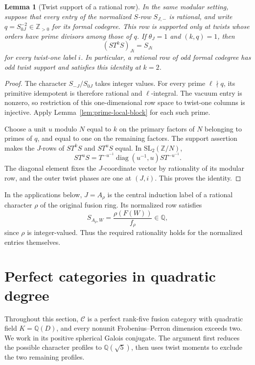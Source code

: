 \documentclass[11pt,a4paper]{article}
\newtheorem{lemma}[theorem]{Lemma}
\numberwithin{equation}{section}
\begin{document}
\begin{lemma}[Twist support of a rational row]\label{lem:odd-row}
In the same modular setting, suppose that every entry of the
normalized $S$-row $S_{J,-}$ is rational, and write
$q=S_{0J}^{-2}\in\mathbb Z_{>0}$ for its formal codegree.
This row is supported only at twists whose orders
have prime divisors among those of $q$. If $\theta_J=1$ and
$(k,q)=1$, then
\[
                    (ST^kS)_{Ji}=S_{Ji}
\]
for every twist-one label $i$. In particular, a rational row of
odd formal codegree has odd twist support and satisfies this identity
at $k=2$.
\end{lemma}
\begin{proof}
The character $S_{-J}/S_{0J}$ takes integer values. For every prime
$\ell\nmid q$, its primitive idempotent is therefore rational and
$\ell$-integral. The vacuum entry is nonzero, so restriction of this
one-dimensional row space to twist-one columns is injective.
Apply Lemma~\ref{lem:prime-local-block} for each such prime.

Choose a unit $u$ modulo $N$ equal to $k$ on the primary factors of
$N$ belonging to primes of $q$, and equal to one on the remaining
factors. The support assertion makes the $J$-rows of $ST^kS$ and
$ST^uS$ equal. In $\mathrm{SL}_2(\mathbb Z/N)$,
\[
 ST^uS=T^{-u^{-1}}\operatorname{diag}(u^{-1},u)ST^{-u^{-1}}.
\]
The diagonal element fixes the $J$-coordinate vector by rationality
of its modular row, and the outer twist phases are one at $(J,i)$.
This proves the identity.
\end{proof}
In the applications below, $J=A_\rho$ is the central induction
label of a rational character $\rho$ of the original fusion ring.
Its normalized row satisfies
\[
 S_{A_\rho,W}=\frac{\rho(F(W))}{f_\rho}\in\mathbb Q,
\]
since $\rho$ is integer-valued. Thus the required rationality holds
for the normalized entries themselves.

\section{Perfect categories in quadratic degree}
\label{sec:perfect-quadratic}

Throughout this section, $\mathcal C$ is a perfect rank-five fusion
category with quadratic field $K=\mathbb Q(D)$, and every nonunit
Frobenius--Perron dimension exceeds two. We work in its positive
spherical Galois conjugate. The argument first reduces the possible
character profiles to $\mathbb Q(\sqrt5)$, then uses twist moments to
exclude the two remaining profiles.
\end{document}
